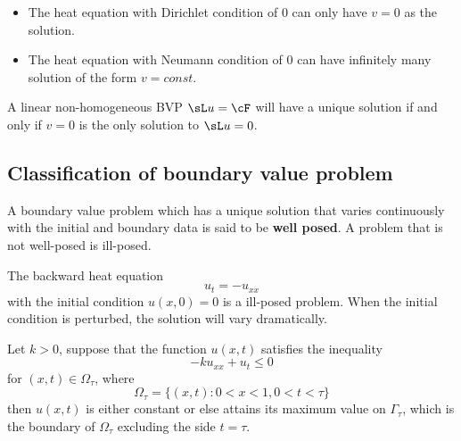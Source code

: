 \begin{refsection}
\begin{example}\hfill
	\begin{itemize}
		\item The heat equation with Dirichlet condition of 0 can only have $v=0$ as the solution.
		\item The heat equation with Neumann condition of 0 can have infinitely many solution of the form $v=const$.
	\end{itemize}
\end{example}


\begin{corollary}\cite[20]{griffiths2015essential}
A linear non-homogeneous BVP $\sL u = \cF$ will have a unique solution if and only if $v = 0$ is the only solution to $\sL u = 0$.
\end{corollary}


\subsection{Classification of boundary value problem}

\begin{definition}\cite[21]{griffiths2015essential}
A boundary value problem which has a unique solution that varies continuously with the initial and boundary data is said to be \textbf{well posed}. A problem that is not well-posed is ill-posed.
\end{definition}

\begin{example}\cite[22]{griffiths2015essential}
The backward heat equation
$$u_t = - u_{xx}$$
with the initial condition $u(x,0) = 0$ is a ill-posed problem. When the initial condition is perturbed, the solution will vary dramatically.
\end{example}


\iffalse

\begin{theorem}[sufficient condition for well-posedness]

\end{theorem}


\begin{definition}
If the linear operator $\mathscr{L}$ is inverse monotone, then the equation $\mathscr{L}u = \mathscr{F}$ has a unique solution.
\end{definition}
\fi

\begin{theorem}\cite[120]{griffiths2015essential}
Let $k > 0$, suppose that the function $u(x,t)$ satisfies the inequality 
$$-ku_{xx}+u_t \leq 0$$
for $(x,t) \in \Omega_{\tau}$, where
$$\Omega_{\tau} =\{(x,t):0<x<1,0<t<\tau\}$$
then $u(x,t)$ is either constant or else attains its maximum value on $\Gamma_{\tau}$, which is the boundary of $\Omega_{\tau}$ excluding the side $t= \tau$.
\end{theorem}


\end{refsection}
